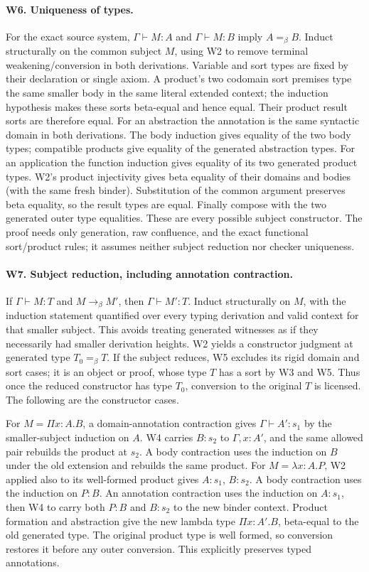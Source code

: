 \paragraph{W6. Uniqueness of types.}
For the exact source system, \(\Gamma\vdash M:A\) and
\(\Gamma\vdash M:B\) imply \(A=_\beta B\).
Induct structurally on the common subject \(M\), using W2 to remove
terminal weakening/conversion in both derivations. Variable and sort
types are fixed by their declaration or single axiom. A product's two
codomain sort premises type the same smaller body in the same literal
extended context; the induction hypothesis makes these sorts beta-equal
and hence equal. Their product result sorts are therefore equal.
For an abstraction the annotation is the same syntactic domain in both
derivations. The body induction gives equality of the two body types;
compatible products give equality of the generated abstraction types.
For an application the function induction gives equality of its two
generated product types. W2's product injectivity gives beta equality of
their domains and bodies (with the same fresh binder). Substitution of
the common argument preserves beta equality, so the result types are
equal. Finally compose with the two generated outer type equalities.
These are every possible subject constructor. The proof needs only
generation, raw confluence, and the exact functional sort/product rules;
it assumes neither subject reduction nor checker uniqueness.

\paragraph{W7. Subject reduction, including annotation contraction.}
If \(\Gamma\vdash M:T\) and \(M\longrightarrow_\beta M'\), then
\(\Gamma\vdash M':T\). Induct structurally on \(M\), with the induction
statement quantified over every typing derivation and valid context for
that smaller subject. This avoids treating generated witnesses as if
they necessarily had smaller derivation heights. W2 yields a constructor
judgment at generated type \(T_0=_\beta T\).
If the subject reduces, W5 excludes its rigid domain and sort cases;
it is an object or proof, whose type \(T\) has a sort by W3 and W5.
Thus once the reduced constructor has type \(T_0\), conversion to
the original \(T\) is licensed. The following are the constructor cases.

For \(M=\Pi x:A.B\), a domain-annotation contraction gives
\(\Gamma\vdash A':s_1\) by the smaller-subject induction on \(A\).
W4 carries \(B:s_2\) to \(\Gamma,x:A'\), and the same allowed pair
rebuilds the product at \(s_2\). A body contraction uses the induction
on \(B\) under the old extension and rebuilds the same product.
For \(M=\lambda x:A.P\), W2 applied also to its well-formed product
gives \(A:s_1\), \(B:s_2\). A body contraction uses the induction
on \(P:B\). An annotation contraction uses the induction on
\(A:s_1\), then W4 to carry both \(P:B\) and \(B:s_2\) to the
new binder context. Product formation and abstraction give the new
lambda type \(\Pi x:A'.B\), beta-equal to the old generated type.
The original product type is well formed, so conversion restores it
before any outer conversion. This explicitly preserves typed annotations.

